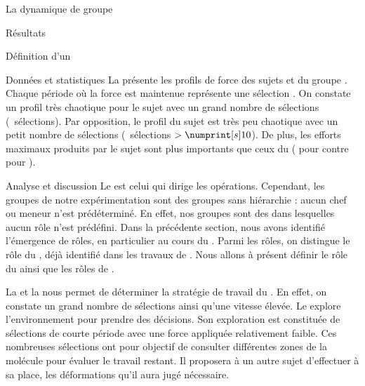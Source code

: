 \documentclass[myfrancais]{mythesis}
\begin{document}
\begin{mychapter}{La dynamique de groupe}
\begin{mysection}{Résultats}
\begin{mysubsection}{Définition d'un }
\begin{mysubsubsection}{Données et statistiques}
					La  présente les profils de force  des sujets  et  du groupe .
					Chaque période où la force est maintenue représente une sélection .
					On constate un profil très chaotique pour le sujet  avec un grand nombre de sélections (~sélections).
					Par opposition, le profil du sujet  est très peu chaotique avec un petit nombre de sélections (~sélections $> \mynum[s]{10}$).
					De plus, les efforts maximaux produits par le sujet  sont plus importants que ceux du  ( pour  contre  pour ).
				\end{mysubsubsection}
				\begin{mysubsubsection}{Analyse et discussion}
					Le  est celui qui dirige les opérations.
					Cependant, les groupes de notre expérimentation sont des groupes sans hiérarchie : aucun chef ou meneur n'est prédéterminé.
					En effet, nos groupes sont des  dans lesquelles aucun rôle n'est prédéfini.
					Dans la précédente section, nous avons identifié l'émergence de rôles, en particulier au cours du \mybrainstorming.
					Parmi les rôles, on distingue le rôle du , déjà identifié dans les travaux de .
					Nous allons à présent définir le rôle du  ainsi que les rôles de .

					La  et la  nous permet de déterminer la stratégie de travail du .
					En effet, on constate un grand nombre de sélections ainsi qu'une vitesse élevée.
					Le  explore l'environnement pour prendre des décisions.
					Son exploration est constituée de sélections de courte période avec une force appliquée relativement faible.
					Ces nombreuses sélections ont pour objectif de consulter différentes zones de la molécule pour évaluer le travail restant.
					Il proposera à un autre sujet d'effectuer à sa place, les déformations qu'il aura jugé nécessaire.


\end{mysubsubsection}
\end{mysubsection}
\end{mysection}
\end{mychapter}
\end{document}
